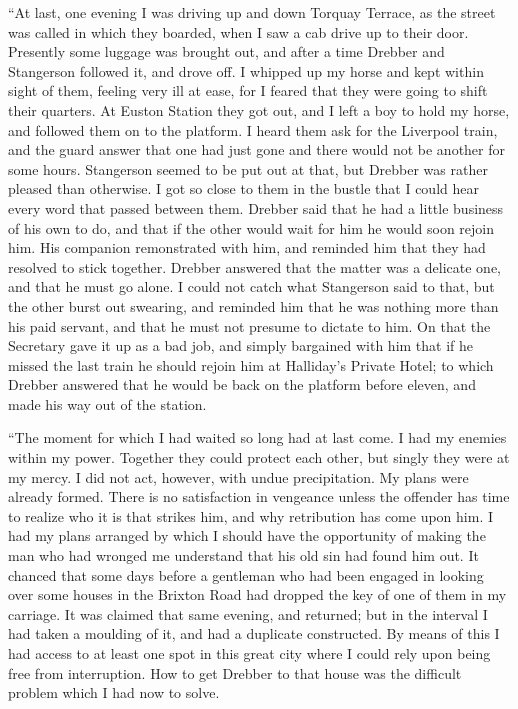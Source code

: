 \documentclass[12pt,english]{book}
\begin{document}
{}``At last, one evening I was driving up and down Torquay Terrace,
as the street was called in which they boarded, when I saw a cab drive
up to their door. Presently some luggage was brought out, and after
a time Drebber and Stangerson followed it, and drove off. I whipped
up my horse and kept within sight of them, feeling very ill at ease,
for I feared that they were going to shift their quarters. At Euston
Station they got out, and I left a boy to hold my horse, and followed
them on to the platform. I heard them ask for the Liverpool train,
and the guard answer that one had just gone and there would not be
another for some hours. Stangerson seemed to be put out at that, but
Drebber was rather pleased than otherwise. I got so close to them
in the bustle that I could hear every word that passed between them.
Drebber said that he had a little business of his own to do, and that
if the other would wait for him he would soon rejoin him. His companion
remonstrated with him, and reminded him that they had resolved to
stick together. Drebber answered that the matter was a delicate one,
and that he must go alone. I could not catch what Stangerson said
to that, but the other burst out swearing, and reminded him that he
was nothing more than his paid servant, and that he must not presume
to dictate to him. On that the Secretary gave it up as a bad job,
and simply bargained with him that if he missed the last train he
should rejoin him at Halliday's Private Hotel; to which Drebber answered
that he would be back on the platform before eleven, and made his
way out of the station.

{}``The moment for which I had waited so long had at last come. I
had my enemies within my power. Together they could protect each other,
but singly they were at my mercy. I did not act, however, with undue
precipitation. My plans were already formed. There is no satisfaction
in vengeance unless the offender has time to realize who it is that
strikes him, and why retribution has come upon him. I had my plans
arranged by which I should have the opportunity of making the man
who had wronged me understand that his old sin had found him out.
It chanced that some days before a gentleman who had been engaged
in looking over some houses in the Brixton Road had dropped the key
of one of them in my carriage. It was claimed that same evening, and
returned; but in the interval I had taken a moulding of it, and had
a duplicate constructed. By means of this I had access to at least
one spot in this great city where I could rely upon being free from
interruption. How to get Drebber to that house was the difficult problem
which I had now to solve.
\end{document}

